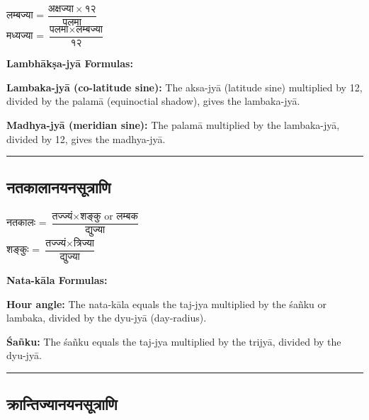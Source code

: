 \documentclass[11pt,a4paper]{article}
\newcommand{\longline}{\noindent\rule{\textwidth}{0.4pt}}
\newcommand{\dev}[1]{{\devanagarifont #1}}
\newcommand{\sectsep}{\par\vspace{0.8em}\longline\vspace{0.8em}}
\begin{document}
\begin{minipage}[t]{0.48\textwidth}
\small\devanagarifont
लम्बज्या = $\dfrac{\text{अक्षज्या} \times १२}{\text{पलमा}}$\\[0.8em]
मध्यज्या = $\dfrac{\text{पलमा} \times \text{लम्बज्या}}{१२}$
\end{minipage}%
\hfill
\begin{minipage}[t]{0.48\textwidth}
\small
\textbf{Lambh\=ak\d{s}a-jy\=a Formulas:}

\textbf{Lambaka-jy\=a (co-latitude sine):} The aksa-jy\=a (latitude sine) multiplied by 12, divided by the palam\=a (equinoctial shadow), gives the lambaka-jy\=a.

\textbf{Madhya-jy\=a (meridian sine):} The palam\=a multiplied by the lambaka-jy\=a, divided by 12, gives the madhya-jy\=a.
\end{minipage}

\sectsep

\subsection{\dev{नतकालानयनसूत्राणि}}

\begin{minipage}[t]{0.48\textwidth}
\small\devanagarifont
नतकालः = $\dfrac{\text{तज्ज्यं} \times \text{शङ्कु or लम्बक}}{\text{द्युज्या}}$\\[0.8em]
शङ्कुः = $\dfrac{\text{तज्ज्यं} \times \text{त्रिज्या}}{\text{द्युज्या}}$
\end{minipage}%
\hfill
\begin{minipage}[t]{0.48\textwidth}
\small
\textbf{Nata-k\=ala Formulas:}

\textbf{Hour angle:} The nata-k\=ala equals the taj-jya multiplied by the \'sa\~nku or lambaka, divided by the dyu-jy\=a (day-radius).

\textbf{\'Sa\~nku:} The \'sa\~nku equals the taj-jya multiplied by the trijy\=a, divided by the dyu-jy\=a.
\end{minipage}

\sectsep

\subsection{\dev{क्रान्तिज्यानयनसूत्राणि}}
\end{document}
